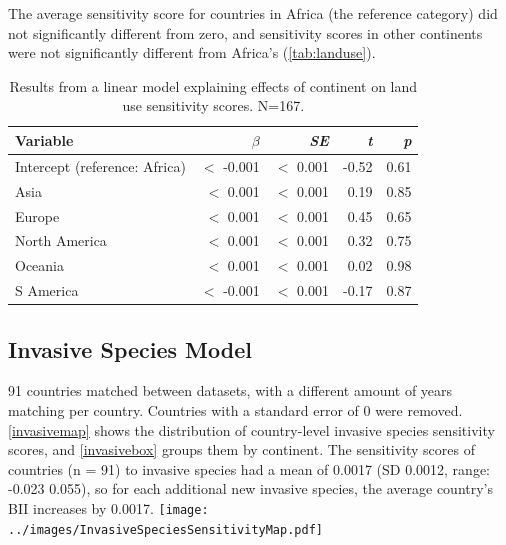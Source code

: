 \documentclass[11pt, a4paper, titlepage]{article}
\begin{document}
    The average sensitivity score for countries in Africa (the reference category) did not significantly different from zero, and sensitivity scores in other continents were not significantly different from Africa's (\autoref{tab:landuse}).
    \begin{table}[h!]
    	\begin{center}
    		\caption{Results from a linear model explaining effects of continent on land use sensitivity scores. \textmd{N=167.}}
    		\label{tab:landuse}
    		\begin{tabular}{l|r|r|r|r} %
    			Variable & $\beta$ & \textit{SE} & \textit{t} & \textit{p}\\
    			\hline
    			Intercept (reference: Africa) & $<$ -0.001 & $<$ 0.001 & -0.52 & 0.61\\
    			Asia & $<$ 0.001 & $<$ 0.001 & 0.19 & 0.85\\
    			Europe & $<$ 0.001 & $<$ 0.001 & 0.45 & 0.65 \\
    			North America & $<$ 0.001 & $<$ 0.001 & 0.32 & 0.75\\
    			Oceania & $<$ 0.001 & $<$ 0.001 & 0.02 & 0.98\\
    			S America & $<$ -0.001 & $<$ 0.001 & -0.17 & 0.87\\
    		\end{tabular}
    	\end{center}
    \end{table}
    
    
	\subsection*{Invasive Species Model}

	
	91 countries matched between datasets, with a different amount of years matching per country. Countries with a standard error of 0 were removed. \autoref{invasivemap} shows the distribution of country-level invasive species sensitivity scores, and \autoref{invasivebox} groups them by continent. The sensitivity scores of countries (n = 91) to invasive species had a mean of 0.0017 (SD 0.0012, range: -0.023  0.055), so for each additional new invasive species, the average country's BII increases by 0.0017.\newline
	\texttt{[image: ../images/InvasiveSpeciesSensitivityMap.pdf]}
	\label{invasivemap}
	
\end{document}

